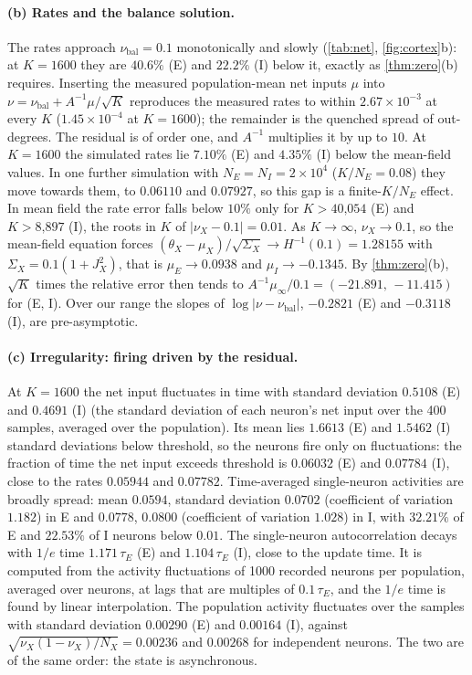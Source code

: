 \documentclass[11pt]{article}
\theoremstyle{definition}\newtheorem{definition}[theorem]{Definition}
\theoremstyle{remark}\newtheorem{remark}[theorem]{Remark}
\begin{document}
\paragraph{(b) Rates and the balance solution.} The rates approach $\nu_{\mathrm{bal}}=0.1$ monotonically and slowly (\cref{tab:net}, \cref{fig:cortex}b): at $K=1600$ they are $40.6\%$ (E) and $22.2\%$ (I) below it, exactly as \cref{thm:zero}(b) requires. Inserting the measured population-mean net inputs $\mu$ into $\nu=\nu_{\mathrm{bal}}+A^{-1}\mu/\sqrt K$ reproduces the measured rates to within $2.67\times10^{-3}$ at every $K$ ($1.45\times10^{-4}$ at $K=1600$); the remainder is the quenched spread of out-degrees. The residual is of order one, and $A^{-1}$ multiplies it by up to $10$. At $K=1600$ the simulated rates lie $7.10\%$ (E) and $4.35\%$ (I) below the mean-field values. In one further simulation with $N_E=N_I=2\times10^4$ ($K/N_E=0.08$) they move towards them, to $0.06110$ and $0.07927$, so this gap is a finite-$K/N_E$ effect. In mean field the rate error falls below $10\%$ only for $K>\text{40,054}$ (E) and $K>\text{8,897}$ (I), the roots in $K$ of $|\nu_X-0.1|=0.01$. As $K\to\infty$, $\nu_X\to0.1$, so the mean-field equation forces $(\theta_X-\mu_X)/\sqrt{\Sigma_X}\to H^{-1}(0.1)=1.28155$ with $\Sigma_X=0.1(1+J_X^2)$, that is $\mu_E\to0.0938$ and $\mu_I\to-0.1345$. By \cref{thm:zero}(b), $\sqrt K$ times the relative error then tends to $A^{-1}\mu_\infty/0.1=(-21.891,\,-11.415)$ for (E, I). Over our range the slopes of $\log|\nu-\nu_{\mathrm{bal}}|$, $-0.2821$ (E) and $-0.3118$ (I), are pre-asymptotic.

\paragraph{(c) Irregularity: firing driven by the residual.} At $K=1600$ the net input fluctuates in time with standard deviation $0.5108$ (E) and $0.4691$ (I) (the standard deviation of each neuron's net input over the 400 samples, averaged over the population). Its mean lies $1.6613$ (E) and $1.5462$ (I) standard deviations below threshold, so the neurons fire only on fluctuations: the fraction of time the net input exceeds threshold is $0.06032$ (E) and $0.07784$ (I), close to the rates $0.05944$ and $0.07782$. Time-averaged single-neuron activities are broadly spread: mean $0.0594$, standard deviation $0.0702$ (coefficient of variation $1.182$) in E and $0.0778$, $0.0800$ (coefficient of variation $1.028$) in I, with $32.21\%$ of E and $22.53\%$ of I neurons below $0.01$. The single-neuron autocorrelation decays with $1/e$ time $1.171\,\tau_E$ (E) and $1.104\,\tau_E$ (I), close to the update time. It is computed from the activity fluctuations of 1000 recorded neurons per population, averaged over neurons, at lags that are multiples of $0.1\,\tau_E$, and the $1/e$ time is found by linear interpolation. The population activity fluctuates over the samples with standard deviation $0.00290$ (E) and $0.00164$ (I), against $\sqrt{\nu_X(1-\nu_X)/N_X}=0.00236$ and $0.00268$ for independent neurons. The two are of the same order: the state is asynchronous.
\end{document}
